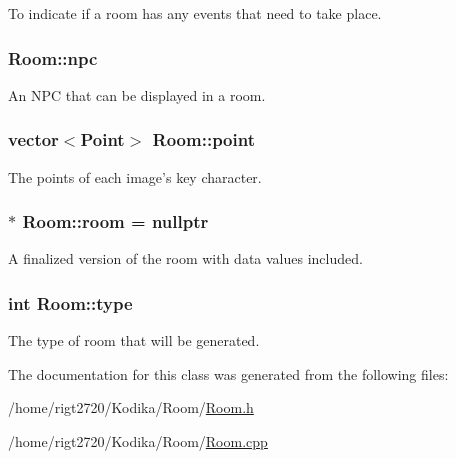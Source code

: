 To indicate if a room has any events that need to take place. 

\hypertarget{classRoom_af71bf7f7e63180da0359dc28be358a46}{
\subsubsection[{npc}]{ Room\-::npc\hspace{0.3cm}{\ttfamily [private]}}}\label{classRoom_af71bf7f7e63180da0359dc28be358a46}


An N\-P\-C that can be displayed in a room. 

\hypertarget{classRoom_aa5729228bac2fa43e1317655ec6dc5b7}{
\subsubsection[{point}]{\setlength{\rightskip}{0pt plus 5cm}vector$<${\bf Point}$>$ Room\-::point}}\label{classRoom_aa5729228bac2fa43e1317655ec6dc5b7}


The points of each image's key character. 

\hypertarget{classRoom_a4d493bf25d07a6880b399adedd3a10e6}{
\subsubsection[{room}]{$\ast$ Room\-::room = nullptr\hspace{0.3cm}{\ttfamily [private]}}}\label{classRoom_a4d493bf25d07a6880b399adedd3a10e6}


A finalized version of the room with data values included. 

\hypertarget{classRoom_a209eba22dbc85cb190906de3f0363e59}{
\subsubsection[{type}]{\setlength{\rightskip}{0pt plus 5cm}int Room\-::type\hspace{0.3cm}{\ttfamily [private]}}}\label{classRoom_a209eba22dbc85cb190906de3f0363e59}


The type of room that will be generated. 



The documentation for this class was generated from the following files\-:\begin{DoxyCompactItemize}
\item 
/home/rigt2720/\-Kodika/\-Room/\hyperlink{Room_8h}{Room.\-h}\item 
/home/rigt2720/\-Kodika/\-Room/\hyperlink{Room_8cpp}{Room.\-cpp}\end{DoxyCompactItemize}
